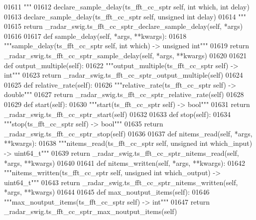 \begin{DoxyCode}
{{{{{{{01611         \textcolor{stringliteral}{"""}
01612 \textcolor{stringliteral}{        declare\_sample\_delay(ts\_fft\_cc\_sptr self, int which, int delay)}
01613 \textcolor{stringliteral}{        declare\_sample\_delay(ts\_fft\_cc\_sptr self, unsigned int delay)}
01614 \textcolor{stringliteral}{        """}
01615         \textcolor{keywordflow}{return} \_radar\_swig.ts\_fft\_cc\_sptr\_declare\_sample\_delay(self, *args)
01616 
01617     \textcolor{keyword}{def }sample_delay(self, *args, **kwargs):
01618         \textcolor{stringliteral}{"""sample\_delay(ts\_fft\_cc\_sptr self, int which) -> unsigned int"""}
01619         \textcolor{keywordflow}{return} \_radar\_swig.ts\_fft\_cc\_sptr\_sample\_delay(self, *args, **kwargs)
01620 
01621     \textcolor{keyword}{def }output_multiple(self):
01622         \textcolor{stringliteral}{"""output\_multiple(ts\_fft\_cc\_sptr self) -> int"""}
01623         \textcolor{keywordflow}{return} \_radar\_swig.ts\_fft\_cc\_sptr\_output\_multiple(self)
01624 
01625     \textcolor{keyword}{def }relative_rate(self):
01626         \textcolor{stringliteral}{"""relative\_rate(ts\_fft\_cc\_sptr self) -> double"""}
01627         \textcolor{keywordflow}{return} \_radar\_swig.ts\_fft\_cc\_sptr\_relative\_rate(self)
01628 
01629     \textcolor{keyword}{def }start(self):
01630         \textcolor{stringliteral}{"""start(ts\_fft\_cc\_sptr self) -> bool"""}
01631         \textcolor{keywordflow}{return} \_radar\_swig.ts\_fft\_cc\_sptr\_start(self)
01632 
01633     \textcolor{keyword}{def }stop(self):
01634         \textcolor{stringliteral}{"""stop(ts\_fft\_cc\_sptr self) -> bool"""}
01635         \textcolor{keywordflow}{return} \_radar\_swig.ts\_fft\_cc\_sptr\_stop(self)
01636 
01637     \textcolor{keyword}{def }nitems_read(self, *args, **kwargs):
01638         \textcolor{stringliteral}{"""nitems\_read(ts\_fft\_cc\_sptr self, unsigned int which\_input) -> uint64\_t"""}
01639         \textcolor{keywordflow}{return} \_radar\_swig.ts\_fft\_cc\_sptr\_nitems\_read(self, *args, **kwargs)
01640 
01641     \textcolor{keyword}{def }nitems_written(self, *args, **kwargs):
01642         \textcolor{stringliteral}{"""nitems\_written(ts\_fft\_cc\_sptr self, unsigned int which\_output) -> uint64\_t"""}
01643         \textcolor{keywordflow}{return} \_radar\_swig.ts\_fft\_cc\_sptr\_nitems\_written(self, *args, **kwargs)
01644 
01645     \textcolor{keyword}{def }max_noutput_items(self):
01646         \textcolor{stringliteral}{"""max\_noutput\_items(ts\_fft\_cc\_sptr self) -> int"""}
01647         \textcolor{keywordflow}{return} \_radar\_swig.ts\_fft\_cc\_sptr\_max\_noutput\_items(self)
}}}}}}}
\end{DoxyCode}
